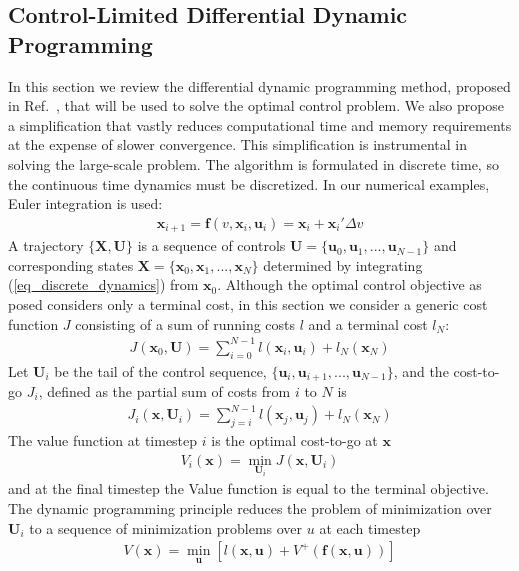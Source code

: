 \documentclass[journal ]{new-aiaa}
\newcommand{\state}{\ensuremath{\mathbf{x}}}
\newcommand{\control}{\ensuremath{\mathbf{u}}}
\newcommand{\State}{\ensuremath{\mathbf{X}}}
\newcommand{\Control}{\ensuremath{\mathbf{U}}}
\begin{document}
\subsection*{Control-Limited Differential Dynamic Programming}
In this section we review the differential dynamic programming method, proposed in Ref.~\cite{DDP_ControlLimited}, that will be used to solve the optimal control problem. We also propose a simplification that vastly reduces computational time and memory requirements at the expense of slower convergence. This simplification is instrumental in solving the large-scale problem.
The algorithm is formulated in discrete time, so the continuous time dynamics must be discretized. In our numerical examples, Euler integration is used:
\begin{align}
\state_{i+1} = \mathbf{f}(v, \state_i,\control_i) = \state_i + \state_i'\Delta v \label{eq_discrete_dynamics}
\end{align}
A trajectory $\{\State,\Control\}$ is a sequence of controls $ \Control=\{\control_0,\control_1,...,\control_{N-1}\} $ and corresponding states $\State=\{\state_0,\state_1,...,\state_N\}$ determined by integrating (\ref{eq_discrete_dynamics}) from $\state_0$.
Although the optimal control objective as posed considers only a terminal cost, in this section we consider a generic cost function $J$ consisting of a sum of running costs $l$ and a terminal cost $l_N$:
\begin{align}
J(\state_0,\Control) = \sum_{i=0}^{N-1}l(\state_i,\control_i) + l_N(\state_N)
\end{align}
Let $\Control_i$ be the tail of the control sequence, $\{\control_i,\control_{i+1},...,\control_{N-1}\}$, and the cost-to-go $J_i$, defined as the partial sum of costs from $i$ to $N$ is
\begin{align}
J_i(\state,\Control_i) = \sum_{j=i}^{N-1}l(\state_j,\control_j) + l_N(\state_N)
\end{align}
The value function at timestep $i$ is the optimal cost-to-go at \state
\begin{align}
V_i(\state) = \min_{\Control_i} J(\state, \Control_i)
\end{align}
and at the final timestep the Value function is equal to the terminal objective. The dynamic programming principle reduces the problem of minimization over $\Control_i$ to a sequence of minimization problems over $u$ at each timestep 
\begin{align}
V(\state) = \min_{\control}\left[l(\state,\control) + V^+(\mathbf{f}(\state,\control))\right] \label{eq_dynamic_programming}
\end{align}
\end{document}
